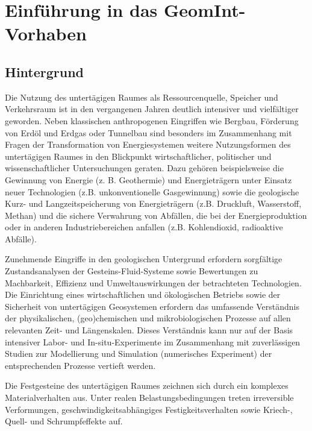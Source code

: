 \chapter*{Einführung in das GeomInt-Vorhaben}
\label{cha:geomint-de}


\section*{Hintergrund} 

Die Nutzung des untertägigen Raumes als Ressourcenquelle, Speicher und Verkehrsraum ist in den vergangenen Jahren deutlich intensiver und vielfältiger geworden. Neben klassischen anthropogenen Eingriffen wie Bergbau, Förderung von Erdöl und Erdgas oder Tunnelbau sind besonders im Zusammenhang mit Fragen der Transformation von Energiesystemen weitere Nutzungsformen des untertägigen Raumes in den Blickpunkt wirtschaftlicher, politischer und wissenschaftlicher Untersuchungen geraten. Dazu gehören beispielsweise die Gewinnung von Energie (z. B. Geothermie) und Energieträgern unter Einsatz neuer Technologien (z.B. unkonventionelle Gasgewinnung) sowie die geologische Kurz- und Langzeitspeicherung von Energieträgern (z.B. Druckluft, Wasserstoff, Methan) und die sichere Verwahrung von Abfällen, die bei der Energieproduktion oder in anderen Industriebereichen anfallen (z.B. Kohlendioxid, radioaktive Abfälle).

Zunehmende Eingriffe in den geologischen Untergrund erfordern sorgfältige Zustandsanalysen der Gesteins-Fluid-Systeme sowie Bewertungen zu Machbarkeit, Effizienz und Umweltauswirkungen der betrachteten Technologien. Die Einrichtung eines wirtschaftlichen und ökologischen Betriebs sowie der Sicherheit von untertägigen Geosystemen erfordern das umfassende Verständnis der physikalischen, (geo)chemischen und mikrobiologischen Prozesse auf allen relevanten Zeit- und Längenskalen. Dieses Verständnis kann nur auf der Basis intensiver Labor- und In-situ-Experimente im Zusammenhang mit zuverlässigen Studien zur Modellierung und Simulation (numerisches Experiment) der entsprechenden Prozesse vertieft werden.

Die Festgesteine des untertägigen Raumes zeichnen sich durch ein komplexes Materialverhalten aus. Unter realen Belastungsbedingungen treten irreversible Verformungen, geschwindigkeitsabhängiges Festigkeitsverhalten sowie Kriech-, Quell- und Schrumpfeffekte auf.

